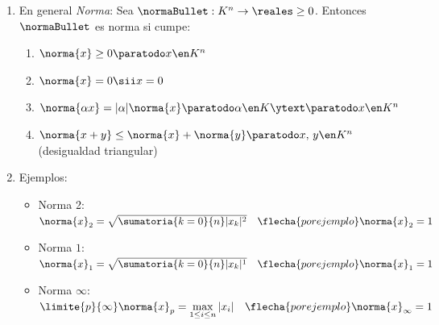 \begin{enumerate}[label=\tiny\purple{\faIcon{snowman}}]
  \item En general \textit{Norma}:
        Sea $\normaBullet : K^n \to \reales\geq0  $. Entonces $\normaBullet$ es
        norma si cumpe:
        \begin{enumerate}[label=\arabic*)]
          \item $\norma{x} \geq 0 \paratodo x \en K^n$
          \item $\norma{x} = 0 \sii x = 0$
          \item $\norma{\alpha x} = |\alpha| \norma{x} \paratodo \alpha \en K \ytext \paratodo x \en K^n$
          \item $\norma{x + y} \leq \norma{x} + \norma{y} \paratodo x,\,y \en K^n$ \quad (desigualdad triangular)
        \end{enumerate}
  \item
        Ejemplos:
        \begin{itemize}
          \item Norma 2:
                $\norma{x}_2 = \sqrt{\sumatoria{k=0}{n} |x_k|^2 }
                  \quad
                  \flecha{por ejemplo}
                  \norma{x}_2 = 1 \quad$

          \item Norma $1$:
                $\norma{x}_1 = \sqrt{\sumatoria{k=0}{n} |x_k|^1 }
                  \quad
                  \flecha{por ejemplo}
                  \norma{x}_1 = 1 \quad$

          \item Norma $\infty$:
                $\limite{p}{\infty} \norma{x}_p = \max\limits_{1\leq i \leq n} |x_i|
                  \quad
                  \flecha{por ejemplo}
                  \norma{x}_{\infty} = 1 \quad$
        \end{itemize}


\end{enumerate}
